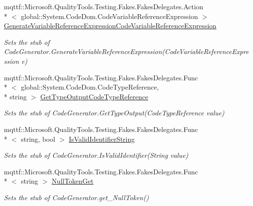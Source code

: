 \begin{DoxyCompactItemize}
mqttf\-::\-Microsoft.\-Quality\-Tools.\-Testing.\-Fakes.\-Fakes\-Delegates.\-Action\\*
$<$ global\-::\-System.\-Code\-Dom.\-Code\-Variable\-Reference\-Expression $>$ \hyperlink{class_system_1_1_code_dom_1_1_compiler_1_1_fakes_1_1_stub_code_generator_adcf9cad95c026c501932bd966a553ee0}{Generate\-Variable\-Reference\-Expression\-Code\-Variable\-Reference\-Expression}
\begin{DoxyCompactList}\small\item\em Sets the stub of Code\-Generator.\-Generate\-Variable\-Reference\-Expression(\-Code\-Variable\-Reference\-Expression e)\end{DoxyCompactList}\item 
mqttf\-::\-Microsoft.\-Quality\-Tools.\-Testing.\-Fakes.\-Fakes\-Delegates.\-Func\\*
$<$ global\-::\-System.\-Code\-Dom.\-Code\-Type\-Reference, \\*
string $>$ \hyperlink{class_system_1_1_code_dom_1_1_compiler_1_1_fakes_1_1_stub_code_generator_ab797175df57c80a1a4a58281b57f6772}{Get\-Type\-Output\-Code\-Type\-Reference}
\begin{DoxyCompactList}\small\item\em Sets the stub of Code\-Generator.\-Get\-Type\-Output(\-Code\-Type\-Reference value)\end{DoxyCompactList}\item 
mqttf\-::\-Microsoft.\-Quality\-Tools.\-Testing.\-Fakes.\-Fakes\-Delegates.\-Func\\*
$<$ string, bool $>$ \hyperlink{class_system_1_1_code_dom_1_1_compiler_1_1_fakes_1_1_stub_code_generator_a079d7bea677f150552a5e9d486c56186}{Is\-Valid\-Identifier\-String}
\begin{DoxyCompactList}\small\item\em Sets the stub of Code\-Generator.\-Is\-Valid\-Identifier(\-String value)\end{DoxyCompactList}\item 
mqttf\-::\-Microsoft.\-Quality\-Tools.\-Testing.\-Fakes.\-Fakes\-Delegates.\-Func\\*
$<$ string $>$ \hyperlink{class_system_1_1_code_dom_1_1_compiler_1_1_fakes_1_1_stub_code_generator_abe744347bbb07b855f31eab972c3ecdb}{Null\-Token\-Get}
\begin{DoxyCompactList}\small\item\em Sets the stub of Code\-Generator.\-get\-\_\-\-Null\-Token()\end{DoxyCompactList}\item 

\end{DoxyCompactItemize}
